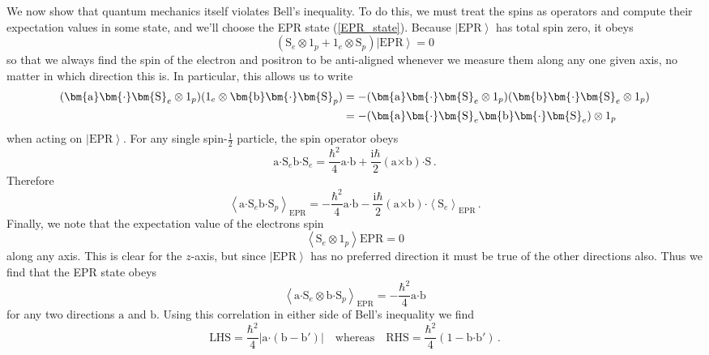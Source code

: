 \documentclass{article}
\theoremstyle{plain}\theoremheaderfont{\normalfont\itshape}\theorembodyfont{\rmfamily}\theoremseparator{.}\newtheorem*{rem}{Remark}\newtheorem*{ex}{Example}\newtheorem*{proof}{Proof}\newtheorem*{altp}{Alternative proof}
\theoremstyle{plain}\theoremheaderfont{\normalfont\bfseries}\theorembodyfont{\rmfamily}\theoremseparator{.}\newtheorem{thm}{Theorem}[section]\newtheorem{lem}[thm]{Lemma}\newtheorem{prop}[thm]{Proposition}\newtheorem*{cor}{Corollary}\newtheorem{defn}[thm]{Definition}\newtheorem{clm}[thm]{Claim}\newtheorem{clminproof}{Claim}
\theoremstyle{break}\theoremheaderfont{\normalfont\itshape}\theorembodyfont{\rmfamily}\theoremseparator{.\medskip}\newtheorem*{proofskip}{Proof}\newtheorem*{exs}{Examples}\newtheorem*{rems}{Remarks}
\theoremstyle{break}\theoremheaderfont{\normalfont\bfseries}\theorembodyfont{\rmfamily}\theoremseparator{.\medskip}\newtheorem{lemskip}[thm]{Lemma}\newtheorem{defnskip}[thm]{Definition}\newtheorem{propskip}[thm]{Proposition}\newtheorem{thmskip}[thm]{Theorem}
\numberwithin{equation}{section}
\newcommand{\ii}{\mathrm{i}}
\newcommand{\ket}[1]{\left| #1 \right\rangle}
\newcommand{\eval}[1]{\left\langle #1 \right\rangle}
\newcommand{\vb}[1]{\bm{\mathrm{#1}}}
\newcommand{\cross}{\bm{\times}}
\newcommand{\vdot}{\bm{\cdot}}
\newcommand{\abs}[1]{\left| #1 \right|}
\begin{document}
    We now show that quantum mechanics itself violates Bell's inequality. To do this, we must treat the spins as operators and compute their expectation values in some state, and we'll choose the EPR state (\ref{EPR_state}). Because \(\ket{\text{EPR}}\) has total spin zero, it obeys
    \begin{equation}
        (\vb{S}_e\otimes 1_p+1_e\otimes\vb{S}_p)\ket{\text{EPR}}=0
    \end{equation}
    so that we always find the spin of the electron and positron to be anti-aligned whenever we measure them along any one given axis, no matter in which direction this is. In particular, this allows us to write
    \begin{align}
        (\vb{a}\vdot\vb{S}_e\otimes 1_p)(1_e\otimes\vb{b}\vdot\vb{S}_p)&=-(\vb{a}\vdot\vb{S}_e\otimes 1_p)(\vb{b}\vdot\vb{S}_e\otimes 1_p)\notag\\
        &=-(\vb{a}\vdot\vb{S}_e \vb{b}\vdot\vb{S}_e)\otimes 1_p
    \end{align}
    when acting on \(\ket{\text{EPR}}\). For any single spin-\(\frac{1}{2}\) particle, the spin operator obeys
    \begin{equation}
        \vb{a}\vdot\vb{S}_e \vb{b}\vdot\vb{S}_e=\frac{\hbar^2}{4}\vb{a}\vdot\vb{b}+\frac{\ii\hbar}{2}(\vb{a}\cross\vb{b})\vdot\vb{S}\,.
    \end{equation}
    Therefore
    \begin{equation}
        \eval{\vb{a}\vdot\vb{S}_e \vb{b}\vdot\vb{S}_p}_{\text{EPR}}=-\frac{\hbar^2}{4}\vb{a}\vdot\vb{b}-\frac{\ii\hbar}{2}(\vb{a}\cross\vb{b})\vdot\eval{\vb{S}_e}_{\text{EPR}}\,.
    \end{equation}
    Finally, we note that the expectation value of the electrons spin
    \begin{equation}
        \eval{\vb{S}_e\otimes 1_p}{\text{EPR}}=0
    \end{equation}
    along any axis. This is clear for the \(z\)-axis, but since \(\ket{\text{EPR}}\) has no preferred direction it must be true of the other directions also. Thus we find that the EPR state obeys
    \begin{equation}
        \eval{\vb{a}\vdot\vb{S}_e\otimes\vb{b}\vdot\vb{S}_p}_{\text{EPR}}=-\frac{\hbar^2}{4}\vb{a}\vdot\vb{b}
    \end{equation}
    for any two directions \(\vb{a}\) and \(\vb{b}\). Using this correlation in either side of Bell's inequality we find
    \begin{equation}
        \text{LHS}=\frac{\hbar^2}{4}\abs{\vb{a}\vdot(\vb{b}-\vb{b}')}\quad\text{whereas}\quad\text{RHS}=\frac{\hbar^2}{4}(1-\vb{b}\vdot\vb{b}')\,.
    \end{equation}
\end{document}
